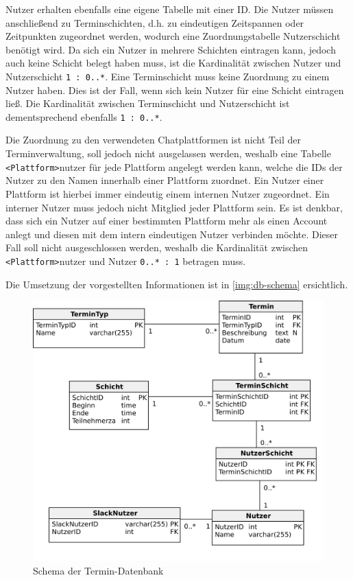 Nutzer erhalten ebenfalls eine eigene Tabelle mit einer ID. Die Nutzer müssen anschließend zu Terminschichten, d.h. zu eindeutigen Zeitspannen oder Zeitpunkten zugeordnet werden, wodurch eine Zuordnungstabelle Nutzerschicht benötigt wird. Da sich ein Nutzer in mehrere Schichten eintragen kann, jedoch auch keine Schicht belegt haben muss, ist die Kardinalität zwischen Nutzer und Nutzerschicht \texttt{1 : 0..*}. Eine Terminschicht muss keine Zuordnung zu einem Nutzer haben. Dies ist der Fall, wenn sich kein Nutzer für eine Schicht eintragen ließ. Die Kardinalität zwischen Terminschicht und Nutzerschicht ist dementsprechend ebenfalls \texttt{1 : 0..*}.

Die Zuordnung zu den verwendeten Chatplattformen ist nicht Teil der Terminverwaltung, soll jedoch nicht ausgelassen werden, weshalb eine Tabelle \texttt{<Plattform>}nutzer für jede Plattform angelegt werden kann, welche die IDs der Nutzer zu den Namen innerhalb einer Plattform zuordnet. Ein Nutzer einer Plattform ist hierbei immer eindeutig einem internen Nutzer zugeordnet. Ein interner Nutzer muss jedoch nicht Mitglied jeder Plattform sein. Es ist denkbar, dass sich ein Nutzer auf einer bestimmten Plattform mehr als einen Account anlegt und diesen mit dem intern eindeutigen Nutzer verbinden möchte. Dieser Fall soll nicht ausgeschlossen werden, weshalb die Kardinalität zwischen \texttt{<Plattform>}nutzer und Nutzer \texttt{0..* : 1} betragen muss.

Die Umsetzung der vorgestellten Informationen ist in \autoref{img:db-schema} ersichtlich.



\begin{figure}[htbp]
    \centering
    \includegraphics[width=\textwidth]{../docs/uml/Steckerbot-DB.png}
    \caption{Schema der Termin-Datenbank}
    \label{img:db-schema}
\end{figure}


